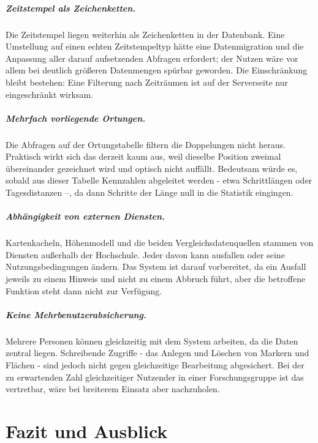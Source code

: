 \documentclass[12pt,a4paper]{report}
\begin{document}
\paragraph{Zeitstempel als Zeichenketten.} Die Zeitstempel liegen weiterhin als Zeichenketten
in der Datenbank. Eine Umstellung auf einen echten Zeitstempeltyp hätte eine Datenmigration
und die Anpassung aller darauf aufsetzenden Abfragen erfordert; der Nutzen wäre vor allem bei
deutlich größeren Datenmengen spürbar geworden. Die Einschränkung bleibt bestehen: Eine
Filterung nach Zeiträumen ist auf der Serverseite nur eingeschränkt wirksam.

\paragraph{Mehrfach vorliegende Ortungen.} Die Abfragen auf der Ortungstabelle filtern die
Doppelungen nicht heraus. Praktisch wirkt sich das derzeit kaum aus, weil dieselbe Position
zweimal übereinander gezeichnet wird und optisch nicht auffällt. Bedeutsam würde es, sobald
aus dieser Tabelle Kennzahlen abgeleitet werden - etwa Schrittlängen oder Tagesdistanzen --,
da dann Schritte der Länge null in die Statistik eingingen.

\paragraph{Abhängigkeit von externen Diensten.} Kartenkacheln, Höhenmodell und die beiden
Vergleichsdatenquellen stammen von Diensten außerhalb der Hochschule. Jeder davon kann
ausfallen oder seine Nutzungsbedingungen ändern. Das System ist darauf vorbereitet, da ein
Ausfall jeweils zu einem Hinweis und nicht zu einem Abbruch führt, aber die betroffene
Funktion steht dann nicht zur Verfügung.

\paragraph{Keine Mehrbenutzerabsicherung.} Mehrere Personen können gleichzeitig mit dem
System arbeiten, da die Daten zentral liegen. Schreibende Zugriffe - das Anlegen und Löschen
von Markern und Flächen - sind jedoch nicht gegen gleichzeitige Bearbeitung abgesichert.
Bei der zu erwartenden Zahl gleichzeitiger Nutzender in einer Forschungsgruppe ist das
vertretbar, wäre bei breiterem Einsatz aber nachzuholen.

\chapter{Fazit und Ausblick}
\label{chap:fazit}
\end{document}
